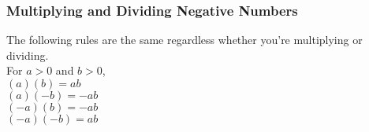 \subsubsection{Multiplying and Dividing Negative Numbers}
The following rules are the same regardless whether you're multiplying or dividing.\\
For $a > 0$ and $b > 0$,\\
$(a)(b)=ab$\\
$(a)(-b)=-ab$\\
$(-a)(b)=-ab$\\
$(-a)(-b)=ab$